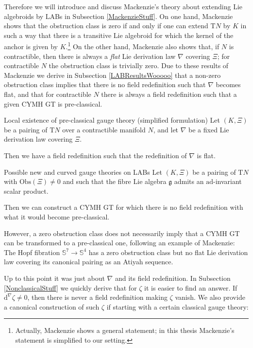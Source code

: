 Therefore we will introduce and discuss Mackenzie's theory about extending Lie algebroids by LABs in Subsection \ref{MackenzieStuff}. On one hand, Mackenzie shows that the obstruction class is zero if and only if one can extend $\mathrm{T}N$ by $K$ in such a way that there is a transitive Lie algebroid for which the kernel of the anchor is given by $K$.\footnote{Actually, Mackenzie shows a general statement; in this thesis Mackenzie's statement is simplified to our setting.} On the other hand, Mackenzie also shows that, if $N$ is contractible, then there is always a \emph{flat} Lie derivation law $\nabla$ covering $\Xi$; for contractible $N$ the obstruction class is trivially zero. Due to these results of Mackenzie we derive in Subsection \ref{LABResultsWooooo} that a non-zero obstruction class implies that there is no field redefinition such that $\nabla$ becomes flat, and that for contractible $N$ there is always a field redefinition such that a given CYMH GT is pre-classical. 

\begin{theorems*}{Local existence of pre-classical gauge theory (simplified formulation)}
Let $(K, \Xi)$ be a pairing of $\mathrm{T}N$ over a contractible manifold $N$, and let $\nabla$ be a fixed Lie derivation law covering $\Xi$.

Then we have a field redefinition such that the redefinition of $\nabla$ is flat.
\end{theorems*}

\begin{theorems*}{Possible new and curved gauge theories on LABs}
Let $(K, \Xi)$ be a pairing of $\mathrm{T}N$ with $\mathrm{Obs}(\Xi) \neq 0$ and such that the fibre Lie algebra $\mathfrak{g}$ admits an $\mathrm{ad}$-invariant scalar product.

Then we can construct a CYMH GT for which there is no field redefinition with what it would become pre-classical.
\end{theorems*}

However, a zero obstruction class does not necessarily imply that a CYMH GT can be transformed to a pre-classical one, following an example of Mackenzie: The Hopf fibration $\mathds{S}^7 \to \mathds{S}^4$ has a zero obstruction class but no flat Lie derivation law covering its canonical pairing as an Atiyah sequence. 

Up to this point it was just about $\nabla$ and its field redefinition. In Subsection \ref{NonclassicalStuff} we quickly derive that for $\zeta$ it is easier to find an answer. If $\mathrm{d}^\nabla \zeta \neq 0$, then there is never a field redefinition making $\zeta$ vanish. We also provide a canonical construction of such $\zeta$ if starting with a certain classical gauge theory:

